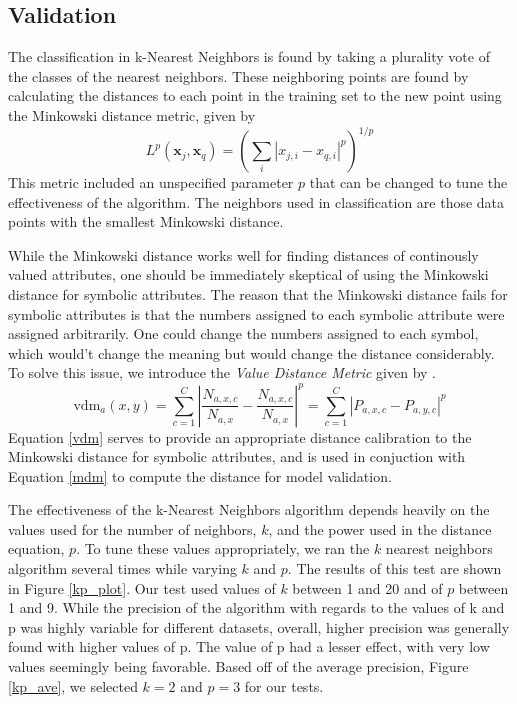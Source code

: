 \documentclass{article}
\newcommand{\ve}[1]{\boldsymbol{\mathbf{#1}}}
\begin{document}
	\subsection{Validation}

		The classification in k-Nearest Neighbors is found by taking a plurality vote of the classes of the nearest neighbors. These neighboring points are found by calculating the distances to each point in the training set to the new point using the Minkowski distance metric, given by
		\begin{equation}
			L^p(\ve{x}_j,\ve{x}_q) = \left( \sum_i \left| x_{j,i} - x_{q,i} \right|^p \right)^{1/p}
			\label{mdm}
		\end{equation}
		This metric included an unspecified parameter $p$ that can be changed to tune the effectiveness of the algorithm.  
		The neighbors used in classification are those data points with the smallest Minkowski distance.
		
		While the Minkowski distance works well for finding distances of continously valued attributes, one should be immediately skeptical of using the Minkowski distance for symbolic attributes. 
		The reason that the Minkowski distance fails for symbolic attributes is that the numbers assigned to each symbolic attribute were assigned arbitrarily. 
		One could change the numbers assigned to each symbol, which would't change the meaning but would change the distance considerably. 
		To solve this issue, we introduce the \textit{Value Distance Metric} given by \cite{wilson1996}.
		\begin{equation}
			\text{vdm}_a(x,y) = \sum_{c=1}^{C} \left| \frac{N_{a,x,c}}{N_{a,x}} - \frac{N_{a,x,c}}{N_{a,x}} \right|^p =  \sum_{c=1}^{C} \left| P_{a,x,c} - P_{a,y,c} \right|^p
			\label{vdm}
		\end{equation}
		Equation \ref{vdm} serves to provide an appropriate distance calibration to the Minkowski distance for symbolic attributes, and is used in conjuction with Equation \ref{mdm} to compute the distance for model validation. 

		The effectiveness of the k-Nearest Neighbors algorithm depends heavily on the values used for the number of neighbors, $k$, and the power used in the distance equation, $p$. To tune these values appropriately, we ran the $k$ nearest neighbors algorithm several times while varying $k$ and $p$. The results of this test are shown in Figure \ref{kp_plot}. Our test used values of $k$ between 1 and 20 and of $p$ between 1 and 9.  While the precision of the algorithm with regards to the values of k and p was highly variable for different datasets, overall, higher precision was generally found with higher values of p.  The value of p had a lesser effect, with very low values seemingly being favorable. Based off of the average precision, Figure \ref{kp_ave}, we selected $k = 2$ and $p = 3$ for our tests.
		
\end{document}
